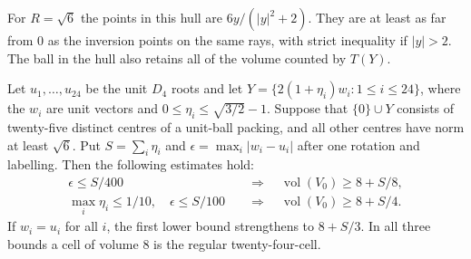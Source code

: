 For $R=\sqrt6$ the points in this hull are $6y/(|y|^2+2)$.
They are at least as far from $0$ as the inversion points on the
same rays, with strict inequality if $|y|>2$. The ball in the hull
also retains all of the volume counted by $T(Y)$.

\begin{thm}
\label{shell-protect:thm}
Let $u_1,\ldots,u_{24}$ be the unit $D_4$ roots and let
$Y=\{2(1+\eta_i)w_i:1\le i\le24\}$, where the $w_i$ are unit vectors
and $0\le\eta_i\le\sqrt{3/2}-1$. Suppose that $\{0\}\cup Y$ consists of
twenty-five distinct centres of a unit-ball packing, and all other
centres have norm at least $\sqrt6$. Put $S=\sum_i\eta_i$ and
$\epsilon=\max_i|w_i-u_i|$ after one rotation and labelling.
Then the following estimates hold:
\begin{align*}
 \epsilon\le S/400 &\quad\Longrightarrow\quad
 \operatorname{vol}(V_0)\ge 8+S/8,\\
 \max_i\eta_i\le1/10,\quad \epsilon\le S/100
 &\quad\Longrightarrow\quad \operatorname{vol}(V_0)\ge 8+S/4 .
\end{align*}
If $w_i=u_i$ for all $i$, the first lower bound strengthens to
$8+S/3$. In all three bounds a cell of volume $8$ is the regular
twenty-four-cell.
\end{thm}

